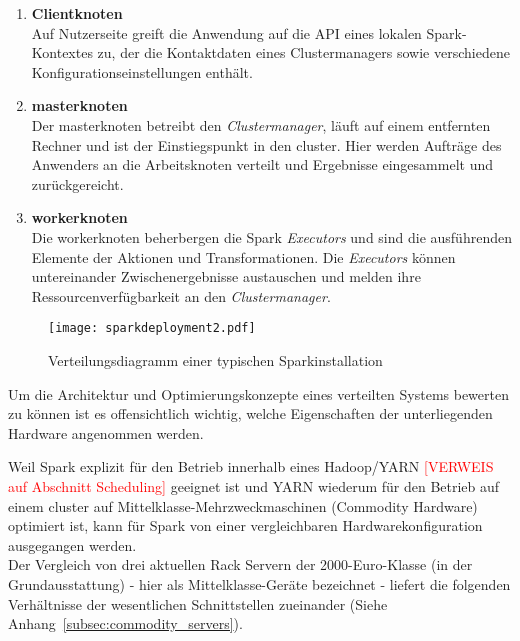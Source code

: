 \begin{enumerate}
	\item \textbf{Clientknoten}\\
	Auf Nutzerseite greift die Anwendung auf die API eines lokalen Spark-Kontextes zu, der die Kontaktdaten eines Clustermanagers sowie verschiedene Konfigurationseinstellungen enthält. 
	
	\item \textbf{\gls{master}knoten}\\
	Der \gls{master}knoten betreibt den \textit{Clustermanager}, läuft auf einem entfernten Rechner und ist der Einstiegspunkt in den \gls{cluster}. Hier werden Aufträge des Anwenders an die Arbeitsknoten verteilt und Ergebnisse eingesammelt und zurückgereicht.
	
	\item \textbf{\gls{worker}knoten}\\
	Die \gls{worker}knoten beherbergen die Spark \textit{Executors} und sind die ausführenden Elemente der Aktionen und Transformationen. Die \textit{Executors} können untereinander Zwischenergebnisse austauschen und melden ihre Ressourcenverfügbarkeit an den \textit{Clustermanager}.
\end{enumerate}

\begin{figure}[ht!]
	\centering
  \texttt{[image: sparkdeployment2.pdf]}
	\caption{Verteilungsdiagramm einer typischen Sparkinstallation}
	\label{fig:sparkdeployment}
\end{figure}

Um die Architektur und Optimierungskonzepte eines verteilten Systems bewerten zu können ist es offensichtlich wichtig, welche Eigenschaften der unterliegenden Hardware angenommen werden.

Weil Spark explizit für den Betrieb innerhalb eines Hadoop/YARN \textcolor{red}{[VERWEIS auf Abschnitt Scheduling]} geeignet ist und YARN wiederum für den Betrieb auf einem \gls{cluster} auf Mittelklasse-Mehrzweckmaschinen (Commodity Hardware) optimiert ist\cite{Mer14}, kann für Spark von einer vergleichbaren Hardwarekonfiguration ausgegangen werden.\\

Der Vergleich von drei aktuellen Rack Servern der 2000-Euro-Klasse (in der Grundausstattung) - hier als Mittelklasse-Geräte bezeichnet - liefert die folgenden Verhältnisse der wesentlichen Schnittstellen zueinander (Siehe Anhang~\ref{subsec:commodity_servers}).

